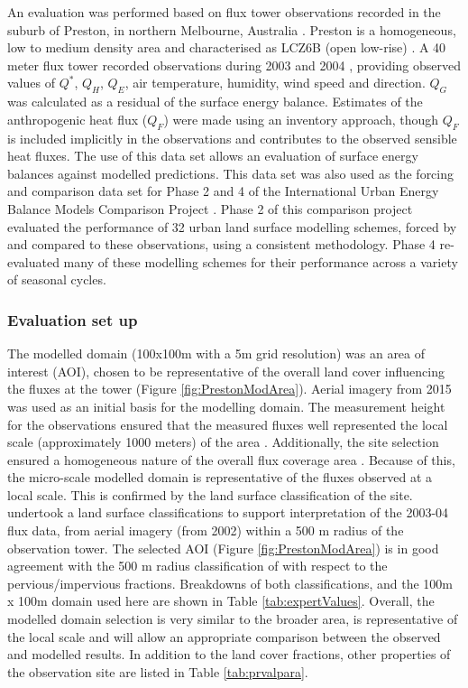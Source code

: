 \documentclass[final,3p,times,authoryear]{elsarticle}
\begin{document}
An evaluation was performed based on flux tower observations recorded in the suburb of Preston, in northern Melbourne, Australia \citep{Coutts2007}. Preston is a homogeneous, low to medium density area and characterised as LCZ6B (open low-rise) \citep{Stewart2012b}. A 40 meter flux tower recorded observations during 2003 and 2004 \citep{Coutts2007}, providing observed values of $Q^{*}$, $Q_{H}$, $Q_{E}$, air temperature, humidity, wind speed and direction. $Q_{G}$ was calculated as a residual of the surface energy balance. Estimates of the anthropogenic heat flux ($Q_{F}$) were made using an inventory approach, though $Q_{F}$ is included implicitly in the observations and contributes to the observed sensible heat fluxes. The use of this data set allows an evaluation of surface energy balances against modelled predictions. This data set was also used as the forcing and comparison data set for Phase 2 and 4 of the International Urban Energy Balance Models Comparison Project \citep{Grimmond2011,Best2012}. Phase 2 of this comparison project evaluated the performance of 32 urban land surface modelling schemes, forced by and compared to these observations, using a consistent methodology. Phase 4 re-evaluated many of these modelling schemes for their performance across a variety of seasonal cycles.

\subsubsection{Evaluation set up}\label{sec:modelsetup}

The modelled domain (100x100m with a 5m grid resolution) was an area of interest (AOI), chosen to be representative of the overall land cover influencing the fluxes at the tower (Figure \ref{fig:PrestonModArea}). Aerial imagery from 2015 \citep{GooglePreston2015} was used as an initial basis for the modelling domain. The measurement height for the observations ensured that the measured fluxes well represented the local scale (approximately 1000 meters) of the area \citep{Coutts2007}. Additionally, the site selection ensured a homogeneous nature of the overall flux coverage area \citep{Schmid1994}. Because of this, the micro-scale modelled domain is representative of the fluxes observed at a local scale. This is confirmed by the land surface classification of the site. \cite{Coutts2007} undertook a land surface classifications to support interpretation of the 2003-04 flux data, from aerial imagery (from 2002) within a 500 m radius of the observation tower. The selected AOI (Figure \ref{fig:PrestonModArea}) is in good agreement with the 500 m radius classification of \cite{Coutts2007} with respect to the pervious/impervious fractions. Breakdowns of both classifications, and the 100m x 100m domain used here are shown in Table \ref{tab:expertValues}. Overall, the modelled domain selection is very similar to the broader area, is representative of the local scale and will allow an appropriate comparison between the observed and modelled results. In addition to the land cover fractions, other properties of the observation site are listed in Table \ref{tab:prvalpara}.
\end{document}
